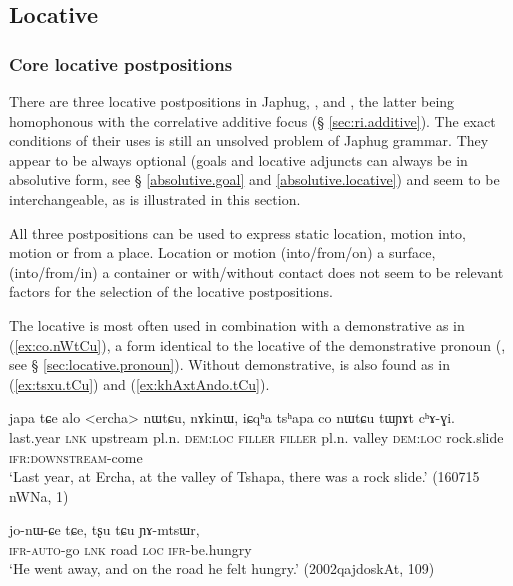 \subsection{Locative} \label{sec:locative}
 

\subsubsection{Core locative postpositions} \label{sec:core.locative}
There are three locative postpositions in Japhug, ,  and , the latter being homophonous with the correlative additive focus  (§ \ref{sec:ri.additive}). The exact conditions of their uses is still an unsolved problem of Japhug grammar. They appear to be always optional (goals and locative adjuncts can always be in absolutive form, see § \ref{absolutive.goal}  and \ref{absolutive.locative}) and seem to be interchangeable, as is illustrated in this section.

All three postpositions can be used to express static location, motion into, motion or from a place. Location or motion (into/from/on) a surface, (into/from/in) a container or with/without contact does not seem to be relevant factors for the selection of the locative postpositions.

The locative   is most often used in combination with a demonstrative  as in (\ref{ex:co.nWtCu}), a form identical to the locative of the demonstrative pronoun (, see § \ref{sec:locative.pronoun}). Without demonstrative,  is also found as in (\ref{ex:tsxu.tCu}) and (\ref{ex:khAxtAndo.tCu}).

\begin{exe}
\ex \label{ex:co.nWtCu}
\gll japa tɕe alo <ercha> nɯtɕu, nɤkinɯ, iɕqʰa tsʰapa co nɯtɕu tɯɲɤt cʰɤ-ɣi. \\
last.year \textsc{lnk} upstream pl.n. \textsc{dem}:\textsc{loc} \textsc{filler}   \textsc{filler}  pl.n. valley \textsc{dem}:\textsc{loc} rock.slide \textsc{ifr}:\textsc{downstream}-come \\
\glt `Last year, at Ercha, at the valley of Tshapa, there was a rock slide.' (160715 nWNa, 1)
\end{exe}

\begin{exe}
\ex \label{ex:tsxu.tCu}
\gll jo-nɯ-ɕe tɕe, tʂu tɕu ɲɤ-mtsɯr, \\
\textsc{ifr}-\textsc{auto}-go \textsc{lnk} road \textsc{loc} \textsc{ifr}-be.hungry \\
\glt `He went away, and on the road he felt hungry.' (2002qajdoskAt, 109)
\end{exe}

